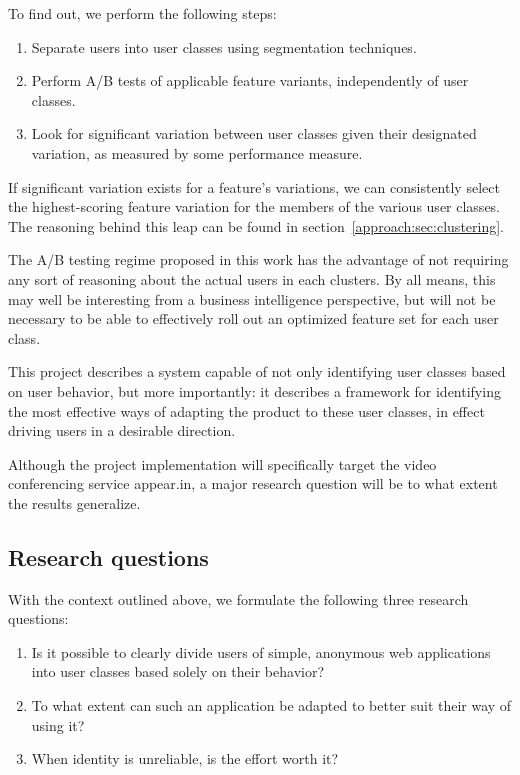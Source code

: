 To find out, we perform the following steps:

\begin{enumerate}
  \item Separate users into user classes using segmentation techniques.
  \item Perform A/B tests of applicable feature variants, independently of user classes.
  \item Look for significant variation between user classes given their designated variation, as measured by some performance measure.
\end{enumerate}

If significant variation exists for a feature's variations, we can consistently select the highest-scoring feature variation for the members of the various user classes. The reasoning behind this leap can be found in section~\ref{approach:sec:clustering}.

The A/B testing regime proposed in this work has the advantage of not requiring any sort of reasoning about the actual users in each clusters. By all means, this may well be interesting from a business intelligence perspective, but will not be necessary to be able to effectively roll out an optimized feature set for each user class.

This project describes a system capable of not only identifying user classes based on user behavior, but more importantly: it describes a framework for identifying the most effective ways of adapting the product to these user classes, in effect driving users in a desirable direction.

Although the project implementation will specifically target the video conferencing service appear.in, a major research question will be to what extent the results generalize.

\subsection{Research questions}
\label{sub:research_questions}

With the context outlined above, we formulate the following three research questions:

\begin{enumerate}
  \item Is it possible to clearly divide users of simple, anonymous web applications into user classes based solely on their behavior?
  \item To what extent can such an application be adapted to better suit their way of using it?
  \item When identity is unreliable, is the effort worth it?
\end{enumerate}

